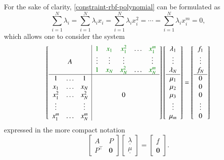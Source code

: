 \documentclass[12pt]{report} %
\newcommand{\tmmathbf}[1]{\ensuremath{\boldsymbol{#1}}}
\begin{document}
For the sake of clarity, \eqref{constraint-rbf-polynomial} can be formulated
as
\[ \sum_{i = 1}^N \lambda_i = \sum_{i = 1}^N \lambda_i x_i = \sum_{i = 1}^N \lambda_i
   x^2_i = \cdots = \sum_{i = 1}^N \lambda_i x^m_i = 0, \]
which allows one to consider the system
\[ \left[\begin{array}{ccc|ccccc}
     &  &  & {\color[HTML]{008000}1} & {\color[HTML]{008000}x_1} &
     {\color[HTML]{008000}x_1^2} & \ldots & {\color[HTML]{008000}x_1^m}\\
     & A &  & \vdots & \vdots & \vdots &  & \vdots\\
     &  &  & {\color[HTML]{008000}1} & {\color[HTML]{008000}x_N} &
     {\color[HTML]{008000}x_N^2} & \ldots & {\color[HTML]{008000}x_N^m}\\ \hline
     1 & \ldots & 1 &  &  &  &  & \\
     x_1 & \ldots & x_N &  &  &  &  & \\
     x_1^2 & \ldots & x_N^2 &  &  & 0 &  & \\
     \vdots &  & \vdots &  &  &  &  & \\
     x_1^m & \ldots & x_N^m &  &  &  &  & 
   \end{array}\right] \left[\begin{array}{c}
     \lambda_1\\
     \vdots\\
     \lambda_N\\
     \hline
     \mu_1\\
     \mu_2\\
     \mu_3\\
     \vdots\\
     \mu_m
   \end{array}\right] = \left[\begin{array}{c}
     f_1\\
     \vdots\\
     f_N\\
     \hline
     0\\
     0\\
     0\\
     \vdots\\
     0
   \end{array}\right] \]
   expressed in the more compact notation
\begin{equation}
    \left[\begin{array}{cc}
     A & P\\
     P^{\top} & \tmmathbf{0}
   \end{array}\right] \left[\begin{array}{c}
     \underline{\lambda}\\
     \underline{\mu}
   \end{array}\right] = \left[\begin{array}{c}
     \underline{f}\\
     \tmmathbf{0}
   \end{array}\right]. \label{eqn-augmented-rbf-poly-system}
\end{equation}
   
\end{document}
